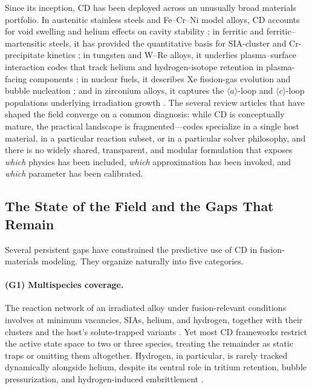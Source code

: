 \documentclass[sn-mathphys-ay,Numbered]{sn-jnl}
\begin{document}
Since its inception, CD has been deployed across an unusually broad
materials portfolio. In austenitic stainless steels and Fe--Cr--Ni
model alloys, CD accounts for void swelling and helium effects on
cavity stability \citep{Ghoniem1979a,GhoniemAlhajji1985,Ortiz2007};
in ferritic and ferritic--martensitic steels, it has provided the
quantitative basis for SIA-cluster and Cr-precipitate kinetics
\citep{StollerCalder2000,Malerba2021a,Bonny2011}; in tungsten and
W--Re alloys, it underlies plasma--surface interaction codes that
track helium and hydrogen-isotope retention in plasma-facing
components \citep{Faney2014,Becquart2014,Ferreira2024}; in nuclear
fuels, it describes Xe fission-gas evolution and bubble nucleation
\citep{Veshchunov2007}; and in zirconium alloys, it captures the
$\langle a\rangle$-loop and $\langle c\rangle$-loop populations
underlying irradiation growth \citep{Christien2010,Maron2024}. The
several review articles that have shaped the field
\citep{KohnertWirth2017,Chen2022,Zheng2023,Ke2023,Xiong2024} converge
on a common diagnosis: while CD is conceptually mature, the
practical landscape is fragmented---codes specialize in a single
host material, in a particular reaction subset, or in a particular
solver philosophy, and there is no widely shared, transparent, and
modular formulation that exposes \emph{which} physics has been
included, \emph{which} approximation has been invoked, and
\emph{which} parameter has been calibrated.

\subsection*{The State of the Field and the Gaps That Remain}

Several persistent gaps have constrained the predictive use of CD in
fusion-materials modeling. They organize naturally into five
categories.

\paragraph{(G1) Multispecies coverage.}
The reaction network of an irradiated alloy under fusion-relevant
conditions involves at minimum vacancies, SIAs, helium, and hydrogen,
together with their clusters and the host's solute-trapped variants
\citep{Ferreira2024,Caturla2008,Lucas2009}. Yet most CD frameworks
restrict the active state space to two or three species, treating the
remainder as static traps or omitting them altogether. Hydrogen, in
particular, is rarely tracked dynamically alongside helium, despite
its central role in tritium retention, bubble pressurization, and
hydrogen-induced embrittlement
\citep{Hayward2013,Becquart2014,Faney2014}.
\end{document}

